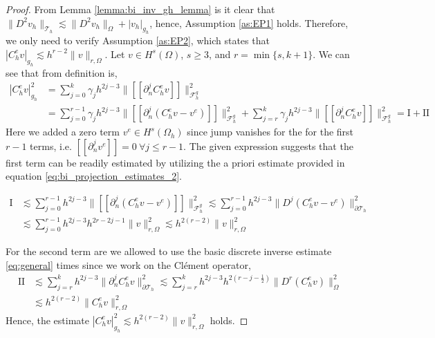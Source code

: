 \documentclass[11pt]{article}
\theoremstyle{remark}
\newcommand{\jump}[1]{\left[\!\left[ #1 \right]\!\right]}
\newcommand{\abs}[1]{\left\lvert #1 \right\rvert}
\renewcommand{\le}{\leqslant}
\renewcommand{\ge}{\geqslant}
\numberwithin{equation}{section}
\begin{document}
\begin{proof}
  From Lemma \ref{lemma:bi_inv_gh_lemma} is it clear that $
    \| D^2v_{h} \|_{ \mathcal{T} _{h} }^{  }  \lesssim \| D^2 v_{h} \|_{ \Omega   }^{  } + \abs{ v_{h} } _{g_{h}}
    $, hence, Assumption \ref{as:EP1} holds.
    Therefore, we only need to verify Assumption \ref{as:EP2}, which states that $ \abs{ C^{e}_{h} v }_{g_{h}} \lesssim h^{r-2} \| v \|_{r, \Omega   }^{  }$.
    Let $v  \in H^{s}( \Omega ) $, $s\ge 3$,  and $r = \min\{s,k+1\} $. We can see that from definition is,
    \begin{equation}
        \label{eq:est_gh:1}
        \begin{split}
        \abs{ C^{e}_{h} v }_{g_{h}}^{2} & = \sum_{j=0}^{k}  \gamma _{j} h^{2j-3}  \| \jump{ \partial ^{j}_{n} C^{e}_{h} v }  \|_{\mathcal{F}_{h}^{g} }^{2} \\
                                        & = \sum_{j=0}^{r-1}  \gamma _{j} h^{2j-3}   \| \jump{ \partial ^{j}_{n}  ( C^{e}_{h} v- v^{e} )  }  \|_{\mathcal{F}_{h}^{g} }^{2} + \sum_{j=r}^{k}  \gamma _{j} h^{2j-3}  \| \jump{ \partial ^{j}_{n} C^{e}_{h} v }
                                        \|_{\mathcal{F}_{h}^{g} }^{2} = \mathrm{I} + \mathrm{II}
        \end{split}
    \end{equation}
    Here we added a zero term $v^{e} \in H^{s}( \Omega_{h} ) $  since jump vanishes for the for the first $r-1$ terms, i.e. $\jump{ \partial ^{j}_{n} v^{e} } = 0  \  \forall j \le r-1$. The given expression suggests that the first term can be readily estimated by utilizing the a priori estimate provided in equation \eqref{eq:bi_projection_estimates_2}.

    \begin{equation}
        \begin{split}
        \mathrm{I}  & \lesssim \sum_{j=0}^{r-1} h^{2j-3}   \| \jump{ \partial ^{j}_{n}  ( C^{e}_{h} v - v^{e})   }  \|_{\mathcal{F}_{h}^{g} }^{2} \lesssim \sum_{j=0}^{r-1} h^{2j-3}   \| D ^{j}  ( C^{e}_{h} v - v^{e})     \|_{\partial \mathcal{T}_{h}  }^{2} \\
        & \lesssim \sum_{j=0}^{r-1} h^{2j-3}  h^{2r - 2j - 1}\| v  \|_{r,\Omega  }^{2} \lesssim     h^{2( r  - 2 )}\| v  \|_{r,\Omega  }^{2}
        \end{split}
    \end{equation}

     For the second term are we allowed to use the basic discrete inverse
    estimate \eqref{eq:general} times since we work on the Clément operator,
    \begin{equation}
        \begin{split}
       \mathrm{II}  & \lesssim \sum_{j=r}^{k} h^{2j-3}  \|  \partial ^{j}_{n} C^{e}_{h} v \|_{\partial \mathcal{T}_{h} }^{2} \lesssim \sum_{j=r}^{k} h^{2j-3} h^{2( r-j -\frac{1}{2}) }  \|  D^r ( C^{e}_{h} v ) \|_{ \Omega  }^{2}  \\
       &  \lesssim h^{2( r-2) } \| C^{e}_{h}v \|_{r,\Omega}^{2}
        \end{split}
    \end{equation}
    Hence, the estimate $\abs{ C^{e}_{h} v }_{g_{h}}^{2} \lesssim h^{2( r -2 )}\| v \|_{r, \Omega   }^{2}$ holds.


\end{proof}
\end{document}
